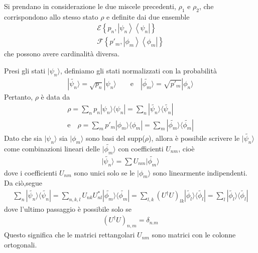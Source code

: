 Si prendano in considerazione le due miscele precedenti, $\rho_1$ e $\rho_2$, che corrispondono allo stesso stato $\rho$ e definite dai due ensemble
\begin{equation}\begin{split}
\mathcal{E}\left\{p_n,\left|\psi _n \right\rangle\left\langle \psi _n\right |\right\} \\
\mathcal{F}\left\{p'_m,\left |\phi _m \right\rangle\left\langle \phi _m\right |\right\}
\end{split}\end{equation}
che possono avere cardinalità diversa.

Presi gli stati $|\psi_n\rangle$, definiamo gli stati normalizzati con la probabilità
\begin{equation}\begin{split}
|\widetilde{\psi_n}\rangle = \sqrt{p_n} |\psi_n\rangle \qquad \textrm{e} \quad |\widetilde{\phi_m}\rangle = \sqrt{p'_m} |\phi_n\rangle
\end{split}\end{equation}
Pertanto, $\rho$ è data da
\begin{equation}\begin{split}
\rho = \sum_n{p_n|\psi_n\rangle \langle \psi_n|} = \sum_n{|\widetilde{\psi_n}\rangle\langle\widetilde{\psi_n}|} \\
\textrm{e} \quad \rho = \sum_m{p'_m|\phi_m\rangle \langle \phi_m|} = \sum_m{|\widetilde{\phi_m}\rangle\langle\widetilde{\phi_m}|}
\end{split}\end{equation}
Dato che sia $|\psi_n\rangle$ sia $|\phi_m\rangle$ sono basi del supp($\rho$), allora è possibile scrivere le $|\widetilde{\psi_n}\rangle$ come combinazioni lineari delle $|\widetilde{\phi_m}\rangle$ con coefficienti $U_{nm}$, cioè
\begin{equation}\begin{split}
|\widetilde{\psi_n}\rangle = \sum{U_{nm}|\widetilde{\phi_m}\rangle}
\end{split}\end{equation}
dove i coefficienti $U_{nm}$ sono unici solo se le $|\phi_m\rangle$ sono linearmente indipendenti.\\
Da ciò,segue
\begin{equation}\begin{split}
\sum_n{|\widetilde{\psi_n}\rangle\langle\widetilde{\psi_n}|} = \sum_{n,k,l}{U_{nk} U^*_{nl}|\widetilde{\phi_m}\rangle\langle\widetilde{\phi_m}|} = \sum_{l,k}{(U^\dag U)_{lk}|\widetilde{\phi_l}\rangle\langle\widetilde{\phi_l}|} = \sum_l{|\widetilde{\phi_l}\rangle\langle\widetilde{\phi_l}|}
\end{split}\end{equation}
dove l'ultimo passaggio è possibile solo se
\begin{equation}\begin{split}
\left(U^\dag U\right)_{n,m}=\delta_{n.m}
\end{split}\end{equation}
Questo significa che le matrici rettangolari $U_{nm}$ sono matrici con le colonne ortogonali.


